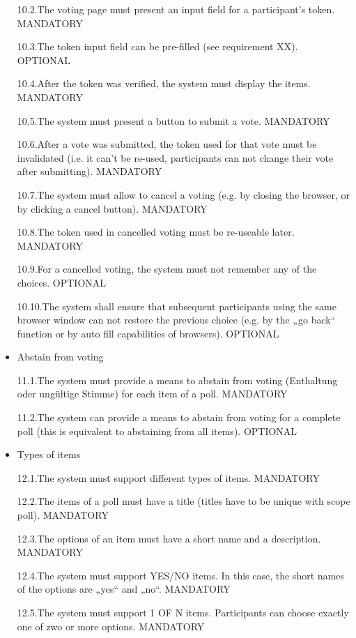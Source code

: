\begin{itemize}
10.2.The voting page must present an input field for a participant’s token. MANDATORY


10.3.The token input field can be pre-filled (see requirement XX). OPTIONAL


10.4.After the token was verified, the system must display the items. MANDATORY


10.5.The system must present a button to submit a vote. MANDATORY


10.6.After a vote was submitted, the token used for that vote must be invalidated (i.e. it can’t be
re-used, participants can not change their vote after submitting). MANDATORY


10.7.The system must allow to cancel a voting (e.g. by closing the browser, or by clicking a cancel
button). MANDATORY


10.8.The token used in cancelled voting must be re-useable later. MANDATORY


10.9.For a cancelled voting, the system must not remember any of the choices. OPTIONAL


10.10.The system shall ensure that subsequent participants using the same browser window
can not restore the previous choice (e.g. by the „go back“ function or by auto fill capabilities
of browsers). OPTIONAL


\item Abstain from voting


11.1.The system must provide a means to abstain from voting (Enthaltung oder ungültige
Stimme) for each item of a poll. MANDATORY


11.2.The system can provide a means to abstain from voting for a complete poll (this is equivalent
to abstaining from all items). OPTIONAL


\item Types of items


12.1.The system must support different types of items. MANDATORY


12.2.The items of a poll must have a title (titles have to be unique with scope poll). MANDATORY


12.3.The options of an item must have a short name and a description. MANDATORY


12.4.The system must support YES/NO items. In this case, the short names of the options are
„yes“ and „no“. MANDATORY


12.5.The system must support 1 OF N items. Participants can choose exactly one of zwo or
more options. MANDATORY



\end{itemize}
